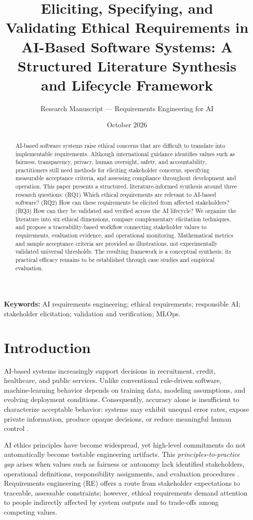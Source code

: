 \documentclass[11pt,a4paper]{article}
\title{\textbf{Eliciting, Specifying, and Validating Ethical Requirements in AI-Based Software Systems: A Structured Literature Synthesis and Lifecycle Framework}}
\author{Research Manuscript --- Requirements Engineering for AI}
\date{October 2026}
\begin{document}
\maketitle
\begin{abstract}
AI-based software systems raise ethical concerns that are difficult to translate into implementable requirements. Although international guidance identifies values such as fairness, transparency, privacy, human oversight, safety, and accountability, practitioners still need methods for eliciting stakeholder concerns, specifying measurable acceptance criteria, and assessing compliance throughout development and operation. This paper presents a structured, literature-informed synthesis around three research questions: (RQ1) Which ethical requirements are relevant to AI-based software? (RQ2) How can these requirements be elicited from affected stakeholders? (RQ3) How can they be validated and verified across the AI lifecycle? We organize the literature into six ethical dimensions, compare complementary elicitation techniques, and propose a traceability-based workflow connecting stakeholder values to requirements, evaluation evidence, and operational monitoring. Mathematical metrics and sample acceptance criteria are provided as illustrations, not experimentally validated universal thresholds. The resulting framework is a conceptual synthesis; its practical efficacy remains to be established through case studies and empirical evaluation.
\end{abstract}
\noindent\textbf{Keywords:} AI requirements engineering; ethical requirements; responsible AI; stakeholder elicitation; validation and verification; MLOps.

\section{Introduction}
AI-based systems increasingly support decisions in recruitment, credit, healthcare, and public services. Unlike conventional rule-driven software, machine-learning behavior depends on training data, modeling assumptions, and evolving deployment conditions. Consequently, accuracy alone is insufficient to characterize acceptable behavior: systems may exhibit unequal error rates, expose private information, produce opaque decisions, or reduce meaningful human control \cite{floridi2018,jobin2019,mehrabi2021}.

AI ethics principles have become widespread, yet high-level commitments do not automatically become testable engineering artifacts. This \emph{principles-to-practice gap} arises when values such as fairness or autonomy lack identified stakeholders, operational definitions, responsibility assignments, and evaluation procedures \cite{mittelstadt2019,morley2020}. Requirements engineering (RE) offers a route from stakeholder expectations to traceable, assessable constraints; however, ethical requirements demand attention to people indirectly affected by system outputs and to trade-offs among competing values.
\end{document}
